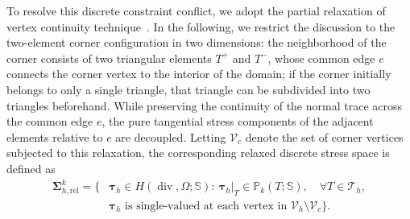 To resolve this discrete constraint conflict, we adopt the partial relaxation of vertex continuity technique~\cite{HuMa2021}. In the following, we restrict the discussion to the two-element corner configuration in two dimensions: the neighborhood of the corner consists of two triangular elements $T^+$ and $T^-$, whose common edge $e$ connects the corner vertex to the interior of the domain; if the corner initially belongs to only a single triangle, that triangle can be subdivided into two triangles beforehand. While preserving the continuity of the normal trace across the common edge $e$, the pure tangential stress components of the adjacent elements relative to $e$ are decoupled. Letting $\mathcal{V}_c$ denote the set of corner vertices subjected to this relaxation, the corresponding relaxed discrete stress space is defined as
\begin{equation}
\label{eq:relaxed_stress_space}
\begin{aligned}
\boldsymbol{\Sigma}_{h,\mathrm{rel}}^k=\bigl\{
&\boldsymbol{\tau}_h\in H(\operatorname{div},\Omega;\mathbb{S}):
\ \boldsymbol{\tau}_h|_T\in\mathbb{P}_k(T;\mathbb{S}),
\quad\forall T\in\mathcal{T}_h,\\
&\boldsymbol{\tau}_h\text{ is single-valued at each vertex in }\mathcal{V}_h\setminus\mathcal{V}_c
\bigr\}.
\end{aligned}
\end{equation}

